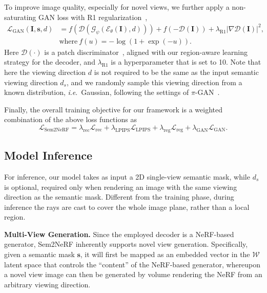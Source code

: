 \documentclass[runningheads]{llncs}
\newcommand{\ie}{\textit{i}.\textit{e}.}
\begin{document}
To improve image quality, especially for novel views, we further apply a non-saturating GAN loss with R1 regularization~\cite{mescheder2018training}, \begin{equation} \label{eq:gan}
\begin{aligned}
\mathcal{L}_{\text{GAN}}(\mathbf{I}, \mathbf{s}, d) & =  f(\mathcal{D}(\mathcal{G}_\psi(\mathcal{E}_\theta(\mathbf{I}), d))) + f(-\mathcal{D}(\mathbf{I})) + \lambda_{\text{R1}} \left | \nabla \mathcal{D}(\mathbf{I}) \right |^2, \\
    & \text{where}\: f(u)  = -\log(1 + \exp(-u)).
\end{aligned}
\end{equation}
Here $\mathcal{D}(\cdot)$ is a patch discriminator~\cite{isola2017image}, aligned with our region-aware learning strategy for the decoder, and $\lambda_{\text{R1}}$ is a hyperparameter that is set to 10. Note that here the viewing direction $d$ is not required to be the same as the input semantic viewing direction $d_s$, and we randomly sample this viewing direction from a known distribution, \ie~Gaussian, following the settings of $\pi$-GAN~\cite{chan2021pi}.

Finally, the overall training objective for our framework is a weighted combination of the above loss functions as
\begin{equation} \label{eq:total_loss}
    \mathcal{L}_{\text{Sem2NeRF}} = \lambda_{\text{rec}} \mathcal{L}_{\text{rec}} + \lambda_{\text{LPIPS}}\mathcal{L}_{\text{LPIPS}} + \lambda_{\text{reg}}\mathcal{L}_{\text{reg}} + \lambda_{\text{GAN}}\mathcal{L}_{\text{GAN}}.
\end{equation}


\subsection{Model Inference}
For inference, our model takes as input a 2D single-view semantic mask, while $d_s$ is optional, required only when rendering an image with the same viewing direction as the semantic mask. Different from the training phase, during inference the rays are cast to cover the whole image plane, rather than a local region. 

\noindent\textbf{Multi-View Generation.} 
Since the employed decoder is a NeRF-based generator, Sem2NeRF inherently supports novel view generation. Specifically, given a semantic mask $\mathbf{s}$, it will first be mapped as an embedded vector in the $\mathcal{W}$ latent space that controls the ``content'' of the NeRF-based generator, whereupon a novel view image can then be generated by volume rendering the NeRF from an arbitrary viewing direction.  
\end{document}
